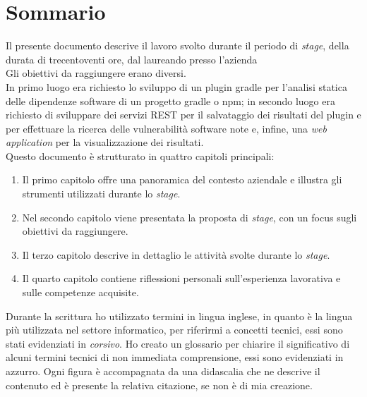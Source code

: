 \cleardoublepage
{}
{}
\begingroup
\let\clearpage\relax
\let\cleardoublepage\relax
\let\cleardoublepage\relax

\chapter*{Sommario}

Il presente documento descrive il lavoro svolto durante il periodo di \textit{stage}, della durata di trecentoventi ore, dal laureando {\myName} presso l'azienda {\azienda} \\
Gli obiettivi da raggiungere erano diversi.\\
In primo luogo era richiesto lo sviluppo di un plugin gradle per l'analisi statica delle dipendenze software di un progetto gradle o npm;
in secondo luogo era richiesto di sviluppare dei servizi REST per il salvataggio dei risultati del plugin e per effettuare la ricerca
delle vulnerabilità software note e, infine,
una \textit{web application} per la visualizzazione dei risultati.\\
Questo documento è strutturato in quattro capitoli principali:
\begin{enumerate}
    \item Il primo capitolo offre una panoramica del contesto aziendale e illustra gli strumenti utilizzati durante lo \textit{stage}.
    \item Nel secondo capitolo viene presentata la proposta di \textit{stage}, con un focus sugli obiettivi da raggiungere.
    \item Il terzo capitolo descrive in dettaglio le attività svolte durante lo \textit{stage}.
    \item Il quarto capitolo contiene riflessioni personali sull'esperienza lavorativa e sulle competenze acquisite.
\end{enumerate}

\noindent Durante la scrittura ho utilizzato termini in lingua inglese, in quanto è la lingua più utilizzata nel settore informatico, per riferirmi a concetti tecnici, essi sono stati evidenziati in \textit{corsivo}.
Ho creato un glossario per chiarire il significativo di alcuni termini tecnici di non immediata comprensione, essi sono evidenziati in azzurro.
Ogni figura è accompagnata da una didascalia che ne descrive il contenuto ed è presente la relativa citazione, se non è di mia creazione.





\endgroup

\vfill
